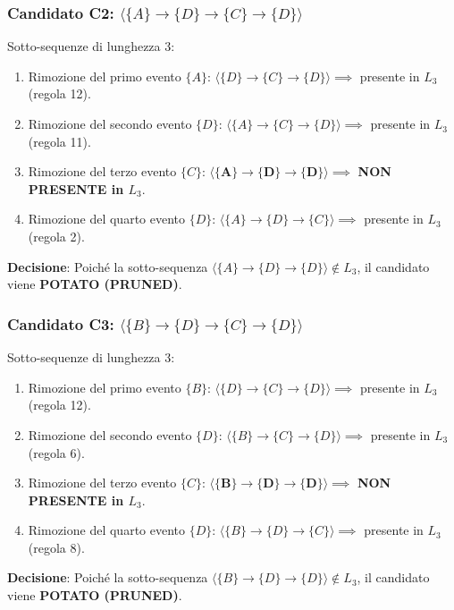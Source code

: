 \subsubsection{Candidato C2: \texorpdfstring{$\langle \{A\} \to \{D\} \to \{C\} \to \{D\} \rangle$}{C2}}
Sotto-sequenze di lunghezza 3:
\begin{enumerate}
    \item Rimozione del primo evento $\{A\}$: $\langle \{D\} \to \{C\} \to \{D\} \rangle \implies$ presente in $L_3$ (regola 12).
    \item Rimozione del secondo evento $\{D\}$: $\langle \{A\} \to \{C\} \to \{D\} \rangle \implies$ presente in $L_3$ (regola 11).
    \item Rimozione del terzo evento $\{C\}$: $\mathbf{\langle \{A\} \to \{D\} \to \{D\} \rangle} \implies$ \textbf{NON PRESENTE in $L_3$}.
    \item Rimozione del quarto evento $\{D\}$: $\langle \{A\} \to \{D\} \to \{C\} \rangle \implies$ presente in $L_3$ (regola 2).
\end{enumerate}
\textbf{Decisione}: Poiché la sotto-sequenza $\langle \{A\} \to \{D\} \to \{D\} \rangle \notin L_3$, il candidato viene \textbf{POTATO (PRUNED)}.

\subsubsection{Candidato C3: \texorpdfstring{$\langle \{B\} \to \{D\} \to \{C\} \to \{D\} \rangle$}{C3}}
Sotto-sequenze di lunghezza 3:
\begin{enumerate}
    \item Rimozione del primo evento $\{B\}$: $\langle \{D\} \to \{C\} \to \{D\} \rangle \implies$ presente in $L_3$ (regola 12).
    \item Rimozione del secondo evento $\{D\}$: $\langle \{B\} \to \{C\} \to \{D\} \rangle \implies$ presente in $L_3$ (regola 6).
    \item Rimozione del terzo evento $\{C\}$: $\mathbf{\langle \{B\} \to \{D\} \to \{D\} \rangle} \implies$ \textbf{NON PRESENTE in $L_3$}.
    \item Rimozione del quarto evento $\{D\}$: $\langle \{B\} \to \{D\} \to \{C\} \rangle \implies$ presente in $L_3$ (regola 8).
\end{enumerate}
\textbf{Decisione}: Poiché la sotto-sequenza $\langle \{B\} \to \{D\} \to \{D\} \rangle \notin L_3$, il candidato viene \textbf{POTATO (PRUNED)}.

